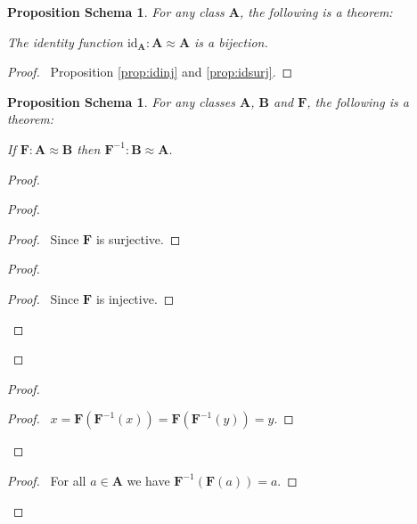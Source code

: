 \documentclass{book}
\let\qed\relax
\newtheorem{props}[ax]{Proposition Schema}
\theoremstyle{definition}
\newcommand{\id}[1]{\ensuremath{\mathrm{id}_{#1}}}
\begin{document}
\begin{props}
\label{prop:idbij}
For any class $\mathbf{A}$, the following is a theorem:

The identity function $\id{\mathbf{A}} : \mathbf{A} \approx \mathbf{A}$ is a bijection.
\end{props}

\begin{proof}
\pf\ Proposition \ref{prop:idinj} and \ref{prop:idsurj}. \qed	
\end{proof}

\begin{props}
\label{prop:invbij}
For any classes $\mathbf{A}$, $\mathbf{B}$ and $\mathbf{F}$, the following is a theorem:

If $\mathbf{F} : \mathbf{A} \approx \mathbf{B}$ then $\mathbf{F}^{-1} : \mathbf{B} \approx \mathbf{A}$.
\end{props}

\begin{proof}
\pf
{}
\begin{proof}
	\begin{proof}
		\pf\ Since $\mathbf{F}$ is surjective.
	\end{proof}
	\begin{proof}
		\begin{proof}
			\pf\ Since $\mathbf{F}$ is injective.
		\end{proof}
	\end{proof}
\end{proof}
\begin{proof}
	\begin{proof}
		\pf\ $x = \mathbf{F}(\mathbf{F}^{-1}(x)) = \mathbf{F}(\mathbf{F}^{-1}(y)) = y$.
	\end{proof}
\end{proof}
\begin{proof}
	\pf\ For all $a \in \mathbf{A}$ we have $\mathbf{F}^{-1}(\mathbf{F}(a)) = a$.
\end{proof}
\qed
\end{proof}
\end{document}
